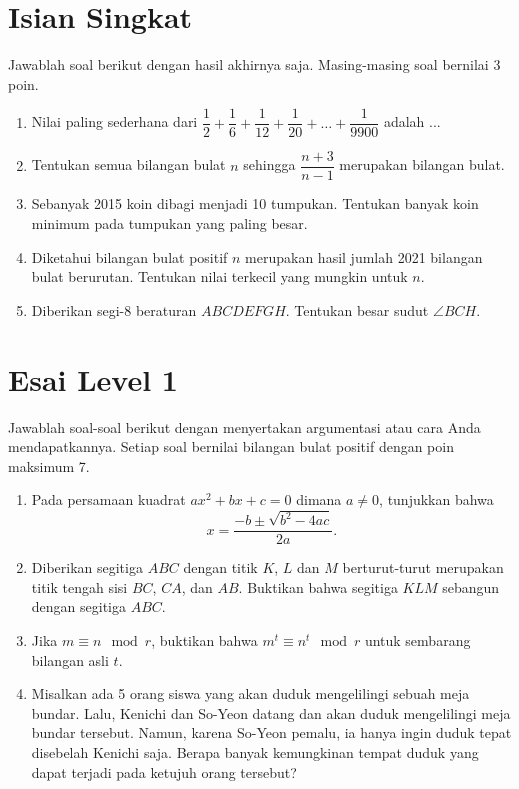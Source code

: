 \documentclass[12pt]{scrartcl}
\begin{document}
\section{Isian Singkat}
Jawablah soal berikut dengan hasil akhirnya saja. Masing-masing soal bernilai 3 poin.
\begin{enumerate}[resume]
	\item Nilai paling sederhana dari $\dfrac{1}{2}+\dfrac{1}{6}+\dfrac{1}{12}+\dfrac{1}{20}+\dots +\dfrac{1}{9900}$ adalah ...
	
	\item Tentukan semua bilangan bulat $n$ sehingga $\dfrac{n+3}{n-1}$ merupakan bilangan bulat.
	
	\item Sebanyak 2015 koin dibagi menjadi 10 tumpukan. Tentukan banyak koin minimum pada tumpukan yang paling besar.
	
	\item Diketahui bilangan bulat positif $n$ merupakan hasil jumlah 2021 bilangan bulat berurutan. Tentukan nilai terkecil yang mungkin untuk $n$.
	
	\item Diberikan segi-8 beraturan $ABCDEFGH$. Tentukan besar sudut $\angle BCH$.
\end{enumerate}

\section{Esai Level 1}
Jawablah soal-soal berikut dengan menyertakan argumentasi atau cara Anda mendapatkannya. Setiap soal bernilai bilangan bulat positif dengan poin maksimum 7.

\begin{enumerate}[resume]
	\item Pada persamaan kuadrat $ax^2+bx+c=0$ dimana $a \neq 0$, tunjukkan bahwa $$x = \frac{-b \pm \sqrt{b^2-4ac}}{2a}.$$
	
	\item Diberikan segitiga $ABC$ dengan titik $K$, $L$ dan $M$ berturut-turut merupakan titik tengah sisi $BC$, $CA$, dan $AB$. Buktikan bahwa segitiga $KLM$ sebangun dengan segitiga $ABC$.
	
	\item Jika $m \equiv n \mod r$, buktikan bahwa $m^t \equiv n^t \mod r$ untuk sembarang bilangan asli $t$.
	
	\item Misalkan ada 5 orang siswa yang akan duduk mengelilingi sebuah meja bundar. Lalu, Kenichi dan So-Yeon datang dan akan duduk mengelilingi meja bundar tersebut. Namun, karena So-Yeon pemalu, ia hanya ingin duduk tepat disebelah Kenichi saja. Berapa banyak kemungkinan tempat duduk yang dapat terjadi pada ketujuh orang tersebut?
	
\end{enumerate}
\end{document}
